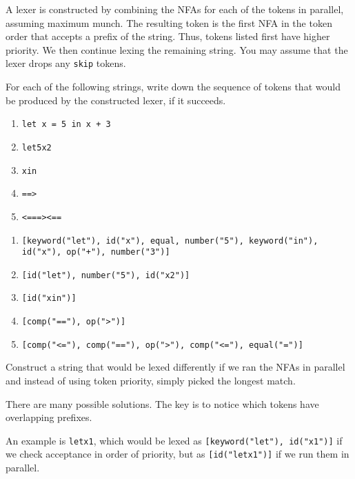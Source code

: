 A lexer is constructed by combining the NFAs for each of the tokens in parallel,
assuming maximum munch. The resulting token is the first NFA in the token order
that accepts a prefix of the string. Thus, tokens listed first have higher
priority. We then continue lexing the remaining string. You may assume that the
lexer drops any \texttt{skip} tokens.

\begin{exercise}{}

  For each of the following strings, write down the sequence of tokens that
  would be produced by the constructed lexer, if it succeeds. 

  \begin{enumerate}
    \item \texttt{let x = 5 in x + 3}
    \item \texttt{let5x2}
    \item \texttt{xin}
    \item \texttt{==>}
    \item \texttt{<===><==}
  \end{enumerate}

  \begin{solution}
    \begin{enumerate}
      \item \texttt{[keyword("let"), id("x"), equal, number("5"), keyword("in"), id("x"), op("+"), number("3")]}
      \item \texttt{[id("let"), number("5"), id("x2")]}
      \item \texttt{[id("xin")]}
      \item \texttt{[comp("=="), op(">")]}
      \item \texttt{[comp("<="), comp("=="), op(">"), comp("<="), equal("=")]}
    \end{enumerate}
  \end{solution}
  
\end{exercise}


\begin{exercise}{}
  Construct a string that would be lexed differently if we ran the NFAs in parallel
  and instead of using token priority, simply picked the longest match.

  \begin{solution}
    There are many possible solutions. The key is to notice which tokens have
    overlapping prefixes.

    An example is \texttt{letx1}, which would be lexed as
    \texttt{[keyword("let"), id("x1")]} if we check acceptance in order of
    priority, but as \texttt{[id("letx1")]} if we run them in parallel.
  \end{solution}
\end{exercise}
  
  
